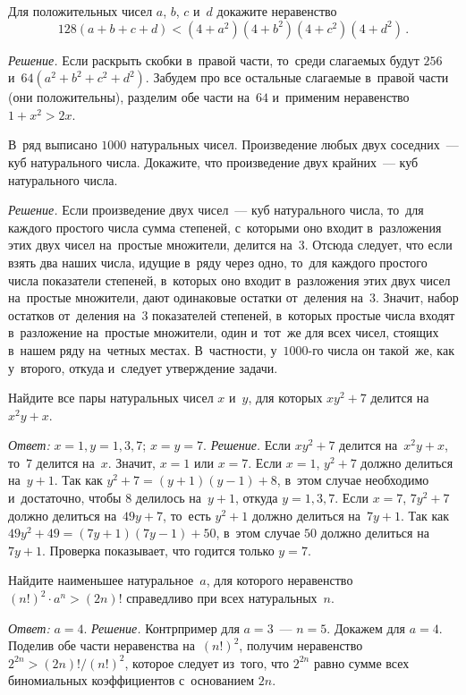 \begin{problems}
Для положительных чисел $a$, $b$, $c$ и~$d$ докажите неравенство
\[
    128 (a + b + c + d)
<
    (4 + a^2) (4 + b^2) (4 + c^2) (4 + d^2)
\, . \]

 \textit{Решение.}
 Если раскрыть скобки в~правой части, то~среди слагаемых будут $256$
 и~$64 (a^{2} + b^{2} + c^{2} + d^{2})$.
 Забудем про все остальные слагаемые в~правой части (они положительны),
 разделим обе части на~$64$ и~применим неравенство $1 + x^{2} > 2 x$.

В~ряд выписано $1000$ натуральных чисел.
Произведение любых двух соседних~--- куб натурального числа.
Докажите, что произведение двух крайних~--- куб натурального числа.

 \textit{Решение.}
 Если произведение двух чисел~--- куб натурального числа, то~для каждого
 простого числа сумма степеней, с~которыми оно входит в~разложения этих двух
 чисел на~простые множители, делится на~$3$.
 Отсюда следует, что если взять два наших числа, идущие в~ряду через одно,
 то~для каждого простого числа показатели степеней, в~которых оно входит
 в~разложения этих двух чисел на~простые множители, дают одинаковые остатки
 от~деления на~$3$.
 Значит, набор остатков от~деления на~$3$ показателей степеней, в~которых
 простые числа входят в~разложение на~простые множители, один и~тот~же для всех
 чисел, стоящих в~нашем ряду на~четных местах.
 В~частности, у~$1000$-го числа он такой~же, как у~второго, откуда и~следует
 утверждение задачи.

Найдите все пары натуральных чисел $x$ и~$y$, для которых $x y^2 + 7$ делится
на~$x^2 y + x$.

 \textit{Ответ:} $x = 1, y = 1, 3, 7$; $x = y = 7$.
 \textit{Решение.}
 Если $x y^{2} + 7$ делится на~$x^{2} y + x$, то~$7$ делится на~$x$.
 Значит, $x = 1$ или $x = 7$.
 Если $x = 1$, $y^{2} + 7$ должно делиться на~$y + 1$.
 Так как $y^{2} + 7 = (y + 1) (y - 1) + 8$, в~этом случае необходимо
 и~достаточно, чтобы $8$ делилось на~$y + 1$, откуда $y = 1, 3, 7$.
 Если $x = 7$, $7 y^{2} + 7$ должно делиться на~$49 y + 7$, то~есть
 $y^{2} + 1$ должно делиться на~$7 y + 1$.
 Так как $49 y^{2} + 49 = (7 y + 1) (7 y - 1) + 50$, в~этом случае $50$ должно
 делиться на~$7 y + 1$.
 Проверка показывает, что годится только $y = 7$.

Найдите наименьшее натуральное~$a$, для которого неравенство
$(n!)^2 \cdot a^n > (2 n)!$ справедливо при всех натуральных~$n$.

 \emph{Ответ:} $a = 4$.
 \emph{Решение.}
 Контрпример для $a = 3$~--- $n = 5$.
 Докажем для $a = 4$.
 Поделив обе части неравенства на~$(n!)^2$, получим неравенство
 $2^{2n} > (2 n)! / (n!)^2$, которое следует из~того, что $2^{2n}$ равно сумме
 всех биномиальных коэффициентов с~основанием $2n$.


\end{problems}

